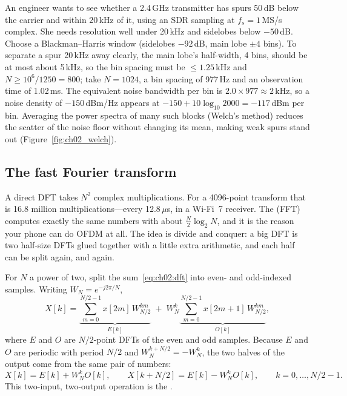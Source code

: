 \begin{worked}
An engineer wants to see whether a 2.4\,GHz transmitter has spurs 50\,dB below the carrier and
within 20\,kHz of it, using an SDR sampling at $f_s=1$\,MS/s complex. She needs resolution well
under 20\,kHz and sidelobes below $-50$\,dB. Choose a Blackman--Harris window (sidelobes $-92$\,dB,
main lobe $\pm4$ bins). To separate a spur 20\,kHz away clearly, the main lobe's half-width, 4 bins,
should be at most about 5\,kHz, so the bin spacing must be $\le1.25$\,kHz and $N\ge
10^6/1250=800$; take $N=1024$, a bin spacing of 977\,Hz and an observation time of 1.02\,ms. The
equivalent noise bandwidth per bin is $2.0\times977\approx2$\,kHz, so a noise density of
$-150$\,dBm/Hz appears at $-150+10\log_{10}2000=-117$\,dBm per bin. Averaging the power spectra of
many such blocks (Welch's method) reduces the scatter of the noise floor without changing its mean,
making weak spurs stand out (Figure~\ref{fig:ch02_welch}).
\end{worked}


\subsection{The fast Fourier transform}

A direct DFT takes $N^2$ complex multiplications. For a 4096-point transform that is 16.8 million
multiplications---every 12.8\,$\mu$s, in a Wi-Fi~7 receiver. The 
(FFT) computes exactly the same numbers with about $\frac N2\log_2N$, and it is the reason your phone
can do OFDM at all. The idea is divide and conquer: a big DFT is two half-size DFTs glued together
with a little extra arithmetic, and each half can be split again, and again.

\begin{deeper}
For $N$ a power of two, split the sum~\eqref{eq:ch02:dft} into even- and odd-indexed samples.
Writing $W_N=e^{-j2\pi/N}$,
\begin{equation}
X[k]=\underbrace{\sum_{m=0}^{N/2-1}x[2m]\,W_{N/2}^{km}}_{E[k]}\;+\;W_N^k\underbrace{\sum_{m=0}^{N/2-1}x[2m+1]\,W_{N/2}^{km}}_{O[k]},
\label{eq:ch02:fftsplit}
\end{equation}
where $E$ and $O$ are $N/2$-point DFTs of the even and odd samples. Because $E$ and $O$ are periodic
with period $N/2$ and $W_N^{k+N/2}=-W_N^k$, the two halves of the output come from the same pair of
numbers:
\begin{equation}
X[k]=E[k]+W_N^kO[k],\qquad X[k+N/2]=E[k]-W_N^kO[k],\qquad k=0,\dots,N/2-1 .
\end{equation}
This two-input, two-output operation is the .
\end{deeper}

